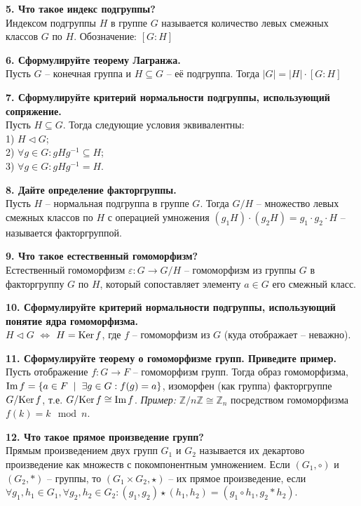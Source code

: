 \documentclass[11pt,a4paper]{article}
\newcommand{\Z}{\mathbb{Z}}
\newcommand{\Ker}[1]{\mathrm{Ker}\hspace{0.5mm}#1}
\renewcommand{\Im}[1]{\mathrm{Im}\hspace{0.5mm}#1}
\renewcommand{\mid}{\hspace{2mm}\middle|\hspace{2mm}}
\begin{document}
\textbf{5. Что такое индекс подгруппы?\\}
Индексом подгруппы $H$ в группе $G$ называется количество левых смежных классов $G$ по $H$. Обозначение: $\left[ G : H \right]$

\textbf{6. Сформулируйте теорему Лагранжа.\\}
Пусть $G$ -- конечная группа и $H \subseteq G$ -- её подгруппа. Тогда $\left\vert G \right\vert = \left\vert H \right\vert \cdot \left[ G : H \right]$
\pagebreak

\textbf{7. Сформулируйте критерий нормальности подгруппы, использующий сопряжение.\\}
Пусть $H \subseteq G$. Тогда следующие условия эквивалентны:\\
1) $H \triangleleft G$;\\
2) $\forall g \in G: g H g^{-1} \subseteq H$;\\
3) $\forall g \in G: g H g^{-1} = H$.

\textbf{8. Дайте определение факторгруппы.\\}
Пусть $H$ -- нормальная подгруппа в группе $G$. Тогда $G / H$ -- множество левых смежных классов по $H$ с операцией умножения $(g_1 H) \cdot (g_2 H) = g_1 \cdot g_2 \cdot H$ -- называется факторгруппой.

\textbf{9. Что такое естественный гомоморфизм?\\}
Естественный гомоморфизм $\varepsilon : G \rightarrow G / H$ -- гомоморфизм из группы $G$ в факторгруппу $G$ по $H$, который сопоставляет элементу $a \in G$ его смежный класс.

\textbf{10. Сформулируйте критерий нормальности подгруппы, использующий понятие ядра гомоморфизма.\\}
$H \triangleleft G$ $\Leftrightarrow$ $H = \Ker{f}$, где $f$ -- гомоморфизм из $G$ (куда отображает -- неважно).

\textbf{11. Сформулируйте теорему о гомоморфизме групп. Приведите пример.\\}
Пусть отображение $f: G \rightarrow F$ -- гомоморфизм групп. Тогда образ гомоморфизма, $\Im{f} = \left\{ a \in F \mid \exists g \in G: f(g) = a \right\}$, изоморфен (как группа) факторгруппе $G / \Ker{f}$, т.е. $G / \Ker{f} \cong \Im{f}$.
\textit{Пример:} $\Z / n\Z \cong \Z_n$ посредством гомоморфизма $f(k) = k \mod n$.

\textbf{12. Что такое прямое произведение групп?\\}
Прямым произведением двух групп $G_1$ и $G_2$ называется их декартово произведение как множеств с покомпонентным умножением. Если $\left( G_1, \circ \right)$ и $\left( G_2, * \right)$ -- группы, то $\left( G_1 \times G_2, \star \right)$ -- их прямое произведение, если $\forall g_1, h_1 \in G_1, \forall g_2, h_2 \in G_2: (g_1, g_2) \star (h_1, h_2) = (g_1 \circ h_1, g_2 * h_2)$.
\end{document}
